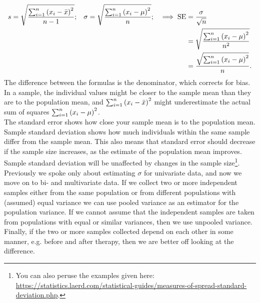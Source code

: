 \begin{align}
    s &= \sqrt{\frac{\sum_{i=1}^n \left( x_i - \bar{x}\right)^2}{n-1}}; & \sigma &= \sqrt{\frac{\sum_{i=1}^n \left( x_i - \mu\right)^2}{n}}; &\implies \text{SE} &= \frac{\sigma}{\sqrt{n}} \label{eq:unisd} \\
    &&&&&= \sqrt{\frac{\sum_{i=1}^n \left( x_i - \mu\right)^2}{n^2}} \\
    &&&&&= \frac{\sqrt{\sum_{i=1}^n \left( x_i - \mu\right)^2}}{n}.
\end{align}
The difference between the formulas is the denominator, which corrects for bias. In a sample, the individual values might be closer to the sample mean than they are to the population mean, and $\sum_{i=1}^n \left( x_i - \bar{x}\right)^2$ might underestimate the actual sum of squares $\sum_{i=1}^n \left( x_i - \mu\right)^2$. 
\\
The standard error shows how close your sample mean is to the population mean. Sample standard deviation shows how much individuals within the same sample differ from the sample mean. This also means that standard error should decrease if the sample size increases, as the estimate of the population mean improves. Sample standard deviation will be unaffected by changes in the sample size\footnote{You can also peruse the examples given here: \url{https://statistics.laerd.com/statistical-guides/measures-of-spread-standard-deviation.php}.}.
\\${}$\\
Previously we spoke only about estimating $\sigma$ for univariate data, and now we move on to bi- and multivariate data. If we collect two or more independent samples either from the same population or from different populations with (assumed) equal variance we can use pooled variance as an estimator for the population variance. If we cannot assume that the independent samples are taken from populations with equal or similar variances, then we use unpooled variance. Finally, if the two or more samples collected depend on each other in some manner, e.g. before and after therapy, then we are better off looking at the difference.
